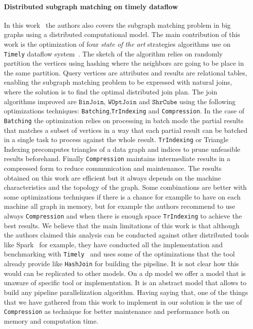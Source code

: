 \paragraph{Distributed subgraph matching on timely dataflow} In this work~\cite{Lai} the authors also covers the subgraph matching problem in big graphs using a distributed computational model. 
The main contribution of this work is the optimization of four \emph{state of the art} strategies algorithms use on \texttt{Timely} dataflow system~\cite{timelyflow}. 
The sketch of the algorithm relies on randomly partition the vertices using hashing where the neighbors are going to be place in the same partition.
Query vertices are attributes and results are relational tables, enabling the subgraph matching problem to be expressed with natural joins, where the solution is to find the optimal distributed join plan.
The join algorithms improved are $\mathtt{BinJoin}$, $\mathtt{WOptJoin}$ and $\mathtt{ShrCube}$ using the following optimizations techniques: \texttt{Batching},\texttt{TrIndexing} and \texttt{Compression}.
In the case of \texttt{Batching} the optimization relies on processing in batch mode the partial results that matches a subset of vertices in a way that each partial result can be batched in a single task to process against the whole result.
\texttt{TrIndexing} or Triangle Indexing precomputes triangles of a data graph and indices to prune unfeasible results beforehand. Finally \texttt{Compression} maintains intermediate results in a compressed form to reduce communication and 
maintenance. The results obtained on this work are efficient but it always depends on the machine characteristics and the topology of the graph. Some combinations are better with some optimizations techniques if there is a chance for examplle to have on each machine 
all graph in memory, but for example the authors recommend to use always \texttt{Compression} and when there is enough space \texttt{TrIndexing} to achieve the best results. 
We believe that the main limitations of this work is that although the authors claimed this analysis can be conducted against other distributed tools like Spark~\cite{apachespark} for example, they have conducted all the implementation and benchmarking with
\texttt{Timely}~\cite{timelyflow} and uses some of the optimizations that the tool already provide like \texttt{HashJoin} for building the pipeline. It is not clear how this would can be replicated to other models.
On a \acrshort{dp} model we offer a model that is unaware of specific tool or implementation. It is an abstract model that allows to build any pipeline parallelization algorithm.
Having saying that, one of the things that we have gathered from this work to implement in our solution is the use of \texttt{Compression} as technique for better maintenance and performance both on memory and computation time.


